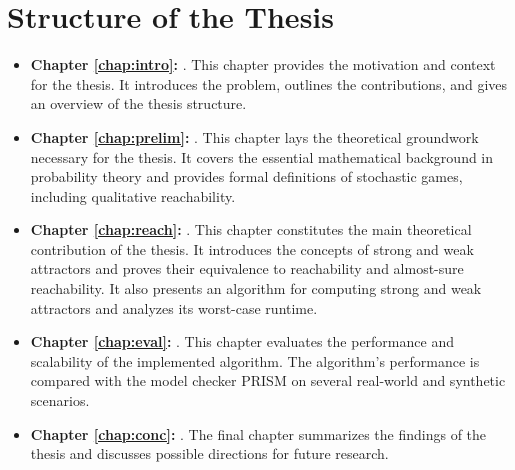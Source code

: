 \section{Structure of the Thesis}
\begin{itemize}
    \item \textbf{Chapter \ref{chap:intro}: }.
    This chapter provides the motivation and context for the thesis. It introduces the problem, outlines the contributions, and gives an overview of the thesis structure.
    
    \item \textbf{Chapter \ref{chap:prelim}: }.  
    This chapter lays the theoretical groundwork necessary for the thesis. It covers the essential mathematical background in probability theory and provides formal definitions of stochastic games, including qualitative reachability.

    \item \textbf{Chapter \ref{chap:reach}: }.
    This chapter constitutes the main theoretical contribution of the thesis. It introduces the concepts of strong and weak attractors and proves their equivalence to reachability and almost-sure reachability. It also presents an algorithm for computing strong and weak attractors and analyzes its worst-case runtime.

    \item \textbf{Chapter \ref{chap:eval}: }.
    This chapter evaluates the performance and scalability of the implemented algorithm. The algorithm's performance is compared with the model checker PRISM on several real-world and synthetic scenarios.

    \item \textbf{Chapter \ref{chap:conc}: }.
    The final chapter summarizes the findings of the thesis and discusses possible directions for future research.
\end{itemize}
